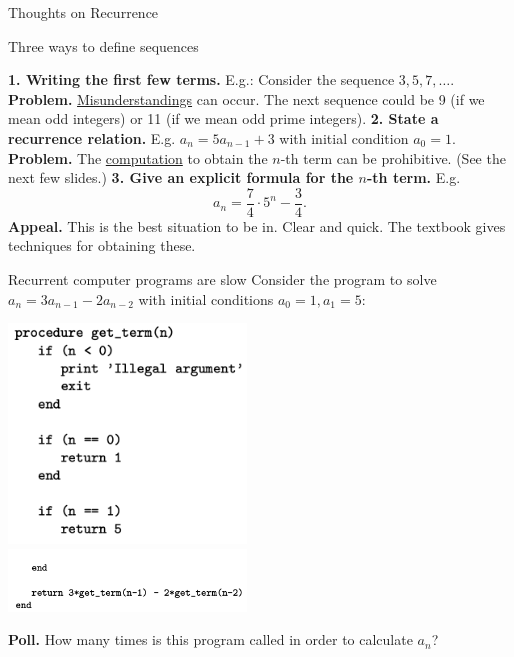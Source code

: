 \documentclass[10pt]{beamer}
\begin{document}
\begin{frame}[standout]
Thoughts on Recurrence
\end{frame}

\begin{frame}{Three ways to define sequences}

\colorbox{green!30}{\textbf{1. Writing the first few terms.}} E.g.: Consider the sequence $3,5,7,\hdots.$ \pause 
\vfill 
\colorbox{red!30}{\textbf{Problem.}} \pause   \underline{Misunderstandings} can occur.  \pause The next sequence could be 9 (if we mean odd integers) or 11 (if we mean odd prime integers). \pause 
\vfill\vfill 
\colorbox{green!30}{\textbf{2. State a recurrence relation.}} \pause E.g. $a_n = 5 a_{n-1} + 3$ with initial condition $a_0=1$. \pause 
\vfill 
\colorbox{red!30}{\textbf{Problem.}} \pause  The \underline{computation} to obtain the $n$-th term can be prohibitive. (See the next few slides.) \pause 
\vfill\vfill 
\colorbox{green!30}{\textbf{3. Give an explicit formula for the $n$-th term.}} E.g.  \pause 
\[ a_n = \frac{7}{4} \cdot 5^n -\frac{3}{4}.\]
\vfill  
\pause \colorbox{yellow!30}{\textbf{Appeal.}} This is the best situation to be in. Clear and quick.  The textbook gives techniques for obtaining these.
\end{frame}


\begin{frame}{Recurrent computer programs are slow}
Consider the program to solve  $a_n = 3 a_{n-1} - 2 a_{n-2}$ with initial conditions $a_0=1, a_1=5$:
    \begin{center}
 \includegraphics[width=0.475\textwidth]{images/recurrence_program_1} \\ 
\includegraphics[width=0.475\textwidth]{images/recurrence_program_2} 
     \end{center} 
 \vfill  
\pause \colorbox{yellow!30}{\textbf{Poll.}} How many times is this program called in order to calculate $a_n$?
\end{frame}
\end{document}
